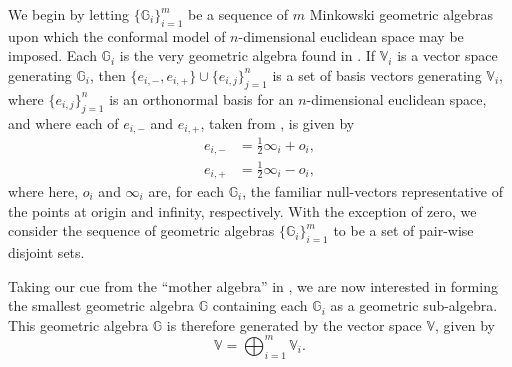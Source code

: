 \documentclass{ecgd-l}
\theoremstyle{definition}
\theoremstyle{remark}
\numberwithin{equation}{section}
\newcommand{\G}{\mathbb{G}}
\newcommand{\V}{\mathbb{V}}
\newcommand{\nvai}{\infty}
\newcommand{\nvao}{o}
\begin{document}
We begin by letting $\{\G_i\}_{i=1}^m$ be a sequence of $m$ Minkowski geometric algebras upon
which the conformal model of $n$-dimensional euclidean space may be imposed.
Each $\G_i$ is the very geometric algebra found in \cite{Hestenes01}.  If $\V_i$ is a vector space
generating $\G_i$, then $\{e_{i,-},e_{i,+}\}\cup\{e_{i,j}\}_{j=1}^n$ is a set of basis
vectors generating $\V_i$, where $\{e_{i,j}\}_{j=1}^n$ is an orthonormal basis
for an $n$-dimensional euclidean space, and where each of $e_{i,-}$ and
$e_{i,+}$, taken from \cite{LiRockwood01}, is given by
\begin{align*}
e_{i,-} &= \frac{1}{2}\nvai_i + \nvao_i, \\
e_{i,+} &= \frac{1}{2}\nvai_i - \nvao_i,
\end{align*}
where here, $\nvao_i$ and $\nvai_i$ are, for each $\G_i$, the familiar null-vectors
representative of the points at origin and infinity, respectively.
With the exception of zero, we consider the sequence of geometric algebras $\{\G_i\}_{i=1}^m$
to be a set of pair-wise disjoint sets.

Taking our cue from the ``mother algebra'' in \cite{DoranHestenes93},
we are now interested in forming the smallest geometric algebra $\G$
containing each $\G_i$ as a geometric sub-algebra.  This geometric
algebra $\G$ is therefore generated by the vector space $\V$, given by
\begin{equation*}
\V=\bigoplus_{i=1}^m \V_i.
\end{equation*}
\end{document}
